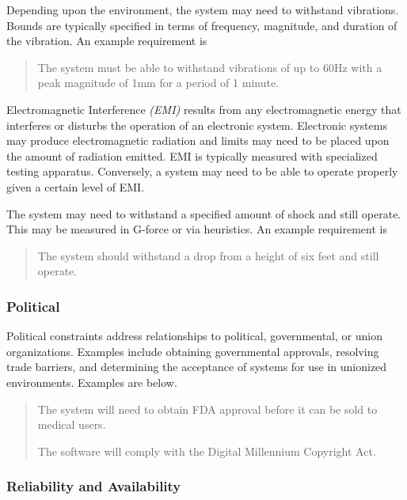 Depending upon the environment, the system may need to withstand
vibrations. Bounds are typically specified in terms of frequency,
magnitude, and duration of the vibration. An example requirement is

\begin{quote}
The system must be able to withstand vibrations of up to 60Hz with a
peak magnitude of 1mm for a period of 1 minute.
\end{quote}

Electromagnetic Interference \emph{(EMI)} results from any
electromagnetic energy that interferes or disturbs the operation of an
electronic system. Electronic systems may produce electromagnetic
radiation and limits may need to be placed upon the amount of radiation
emitted. EMI is typically measured with specialized testing apparatus.
Conversely, a system may need to be able to operate properly given a
certain level of EMI.

The system may need to withstand a specified amount of shock and still
operate. This may be measured in G-force or via heuristics. An example
requirement is

\begin{quote}
The system should withstand a drop from a height of six feet and still
operate.
\end{quote}

\subsubsection*{Political}\label{political}

Political constraints address relationships to political, governmental,
or union organizations. Examples include obtaining governmental
approvals, resolving trade barriers, and determining the acceptance of
systems for use in unionized environments. Examples are below.

\begin{quote}
The system will need to obtain FDA approval before it can be sold to
medical users.

The software will comply with the Digital Millennium Copyright Act.
\end{quote}

\subsubsection*{Reliability and
Availability}\label{reliability-and-availability}

